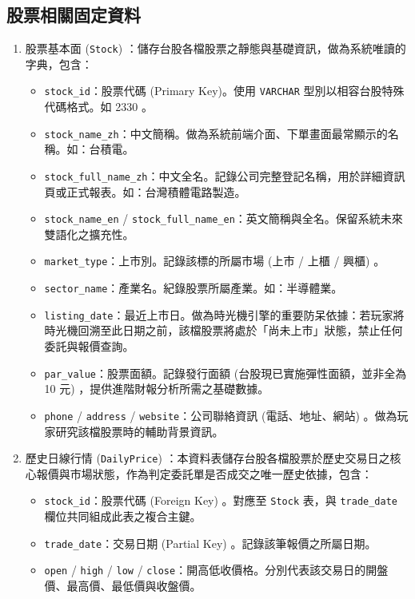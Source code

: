\documentclass[UTF8, a4paper, 12pt, fontset=none]{ctexart}
\begin{document}
    \subsection{股票相關固定資料}
    \begin{enumerate}
        \item 股票基本面 (\texttt{Stock}) ：儲存台股各檔股票之靜態與基礎資訊，做為系統唯讀的字典，包含：
        \begin{itemize}
            \item \texttt{stock\_id}：股票代碼 (Primary Key)。使用 \texttt{VARCHAR} 型別以相容台股特殊代碼格式。如 2330 。
            \item \texttt{stock\_name\_zh}：中文簡稱。做為系統前端介面、下單畫面最常顯示的名稱。如：台積電。
            \item \texttt{stock\_full\_name\_zh}：中文全名。記錄公司完整登記名稱，用於詳細資訊頁或正式報表。如：台灣積體電路製造。
            \item \texttt{stock\_name\_en} / \texttt{stock\_full\_name\_en}：英文簡稱與全名。保留系統未來雙語化之擴充性。
            \item \texttt{market\_type}：上市別。記錄該標的所屬市場 (上市 / 上櫃 / 興櫃) 。
            \item \texttt{sector\_name}：產業名。紀錄股票所屬產業。如：半導體業。
            \item \texttt{listing\_date}：最近上市日。做為時光機引擎的重要防呆依據：若玩家將時光機回溯至此日期之前，該檔股票將處於「尚未上市」狀態，禁止任何委託與報價查詢。
            \item \texttt{par\_value}：股票面額。記錄發行面額 (台股現已實施彈性面額，並非全為 10 元) ，提供進階財報分析所需之基礎數據。
            \item \texttt{phone} / \texttt{address} / \texttt{website}：公司聯絡資訊 (電話、地址、網站) 。做為玩家研究該檔股票時的輔助背景資訊。
        \end{itemize}
        \item 歷史日線行情 (\texttt{DailyPrice}) ：本資料表儲存台股各檔股票於歷史交易日之核心報價與市場狀態，作為判定委託單是否成交之唯一歷史依據，包含：
        \begin{itemize}
            \item \texttt{stock\_id}：股票代碼 (Foreign Key) 。對應至 \texttt{Stock} 表，與 \texttt{trade\_date} 欄位共同組成此表之複合主鍵。
            \item \texttt{trade\_date}：交易日期 (Partial Key) 。記錄該筆報價之所屬日期。
            \item \texttt{open} / \texttt{high} / \texttt{low} / \texttt{close}：開高低收價格。分別代表該交易日的開盤價、最高價、最低價與收盤價。

\end{itemize}
\end{enumerate}
\end{document}
